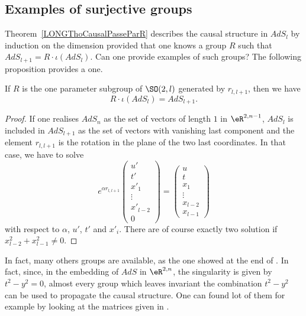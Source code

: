 %
\subsection{Examples of surjective groups}
%

Theorem~\ref{LONGThoCausalPasseParR} describes the causal structure in $AdS_l$ by induction on the dimension provided that one knows a group $R$ such that $AdS_{l+1}=R\cdot \iota(AdS_l)$. Can one provide examples of such groups? The following proposition provides a one.

\begin{proposition}        \label{LONGPropSurjectif}
	If $R$ is the one parameter subgroup of $\SO(2,l)$ generated by $r_{l,l+1}$, then we have
	\begin{equation}
		R\cdot \iota(AdS_l)= AdS_{l+1}.
	\end{equation}
\end{proposition}

%
%
%
%
%
%
%
%
%
%
%
%
%
%
%
%
%
%
%
%
%
%
%
%
%
%
%
%
%
%
%
%
%
%
%
%
%
%
%
%
%
%
%
%

\begin{proof}
	If one realises $AdS_n$ as the set of vectors of length $1$ in $\eR^{2,n-1}$, $AdS_l$ is included in $AdS_{l+1}$ as the set of vectors with vanishing last component and the element $r_{l,l+1}$ is the rotation in the plane of the two last coordinates. In that case, we have to solve
	\begin{equation}
		e^{\alpha r_{l,l+1}}\begin{pmatrix}
			u'       \\
			t'       \\
			x'_1     \\
			\vdots   \\
			x'_{l-2} \\
			0
		\end{pmatrix}=
		\begin{pmatrix}
			u       \\
			t       \\
			x_1     \\
			\vdots  \\
			x_{l-2} \\
			x_{l-1}
		\end{pmatrix}
	\end{equation}
	with respect to $\alpha$, $u'$, $t'$ and $x'_i$. There are of course exactly two solution if $x_{l-2}^2+x_{l-1}^2\neq 0$.
\end{proof}

In fact, many others groups are available, as the one showed at the end of \cite{BTZ_horizon}. In fact, since, in the embedding of $AdS$ in $\eR^{2,n}$, the singularity is given by $t^2-y^2=0$, almost every group which leaves invariant the combination $t^2-y^2$ can be used to propagate the causal structure. One can found lot of them for example by looking at the matrices given in \cite{These}.

